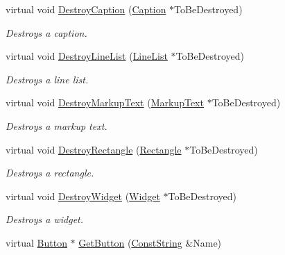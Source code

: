 \begin{DoxyCompactItemize}
virtual void \hyperlink{classMezzanine_1_1UI_1_1Layer_affc70067d7d58d342f3d81bae1b059af}{DestroyCaption} (\hyperlink{classMezzanine_1_1UI_1_1Caption}{Caption} $\ast$ToBeDestroyed)
\begin{DoxyCompactList}\small\item\em Destroys a caption. \item\end{DoxyCompactList}\item 
virtual void \hyperlink{classMezzanine_1_1UI_1_1Layer_a6886628b065bf846061b4dea1726ad57}{DestroyLineList} (\hyperlink{classMezzanine_1_1UI_1_1LineList}{LineList} $\ast$ToBeDestroyed)
\begin{DoxyCompactList}\small\item\em Destroys a line list. \item\end{DoxyCompactList}\item 
virtual void \hyperlink{classMezzanine_1_1UI_1_1Layer_a7f53065d958576cda9322520c71be80f}{DestroyMarkupText} (\hyperlink{classMezzanine_1_1UI_1_1MarkupText}{MarkupText} $\ast$ToBeDestroyed)
\begin{DoxyCompactList}\small\item\em Destroys a markup text. \item\end{DoxyCompactList}\item 
virtual void \hyperlink{classMezzanine_1_1UI_1_1Layer_a3ad9ddd61bb7bd8ae418f7df8bed1ff5}{DestroyRectangle} (\hyperlink{classMezzanine_1_1UI_1_1Rectangle}{Rectangle} $\ast$ToBeDestroyed)
\begin{DoxyCompactList}\small\item\em Destroys a rectangle. \item\end{DoxyCompactList}\item 
virtual void \hyperlink{classMezzanine_1_1UI_1_1Layer_a249e2ed0a11581932464c576b9f763c1}{DestroyWidget} (\hyperlink{classMezzanine_1_1UI_1_1Widget}{Widget} $\ast$ToBeDestroyed)
\begin{DoxyCompactList}\small\item\em Destroys a widget. \item\end{DoxyCompactList}\item 
virtual \hyperlink{classMezzanine_1_1UI_1_1Button}{Button} $\ast$ \hyperlink{classMezzanine_1_1UI_1_1Layer_a35636ea8bbb02c7cbd7236db3ad48a7e}{GetButton} (\hyperlink{namespaceMezzanine_a63cd699ac54b73953f35ec9cfc05e506}{ConstString} \&Name)

\end{DoxyCompactItemize}
